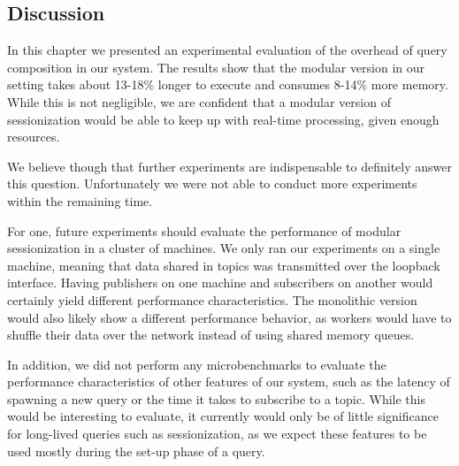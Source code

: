 \clearpage
\subsection{Discussion}

In this chapter we presented an experimental evaluation of the overhead of
query composition in our system. The results show that the modular version in
our setting takes about 13-18\% longer to execute and consumes 8-14\% more
memory. While this is not negligible, we are confident that a modular version
of sessionization would be able to keep up with real-time processing, given
enough resources.

We believe though that further experiments are indispensable to definitely 
answer this question. Unfortunately we were not able to conduct more experiments
within the remaining time.

For one, future experiments should evaluate the performance of modular sessionization
in a cluster of machines. We only ran our experiments on a single machine, meaning that
data shared in topics was transmitted over the loopback interface.
Having publishers on one machine and subscribers on another would certainly yield
different performance characteristics. The monolithic version would also
likely show a different performance behavior, as workers would have to shuffle their data over the
network instead of using shared memory queues.

In addition, we did not perform any microbenchmarks to evaluate the performance
characteristics of other features of our system, such as the latency
of spawning a new query or the time it takes to subscribe to a topic. While
this would be interesting to evaluate, it currently would only be of little
significance for long-lived queries such as sessionization, as we expect
these features to be used mostly during the set-up phase of a query.
